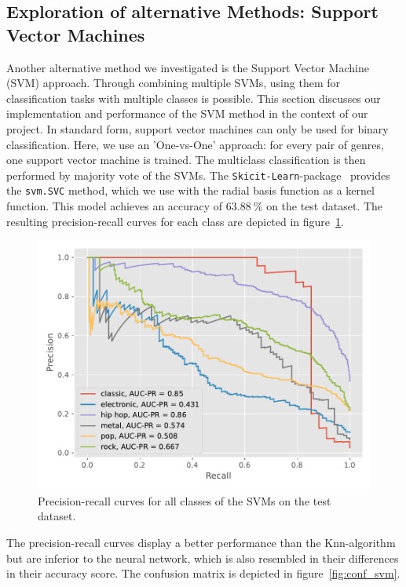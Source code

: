 \documentclass[
  12pt,
  bibliography=totoc,     %
  captions=tableheading,  %
  titlepage=firstiscover, %
]{scrartcl}
\begin{document}
\subsection{Exploration of alternative Methods: Support Vector Machines}
Another alternative method we investigated is the Support Vector Machine (SVM) approach. Through combining multiple SVMs, using them for classification tasks with multiple
classes is possible.
This section discusses our implementation and performance of the SVM method in the context of our project.
In standard form, support vector machines can only be used for binary classification. Here, we use an 'One-vs-One' approach: for every pair of genres, one support vector
machine is trained. The multiclass classification is then performed by majority vote of the SVMs. The \texttt{Skicit-Learn}-package~\cite{scikit-learn} provides the \texttt{svm.SVC} method,
which we use with the radial basis function as a kernel function. This model achieves an accuracy of $\SI{63.88}{\percent}$ on the test dataset. The resulting
precision-recall curves for each class are depicted in figure~\ref{fig:svm_pr}.
\begin{figure}[H]
  \centering
  \includegraphics[scale=0.7]{figures/svm/PR_SVM.pdf}
  \caption{Precision-recall curves for all classes of the SVMs on the test dataset.}
  \label{fig:svm_pr}
\end{figure}
\noindent
The precision-recall curves display a better performance than the Knn-algorithm but are inferior to the neural network, which is also resembled in their differences
in their accuracy score. The confusion matrix is depicted in figure~\ref{fig:conf_svm}.
\end{document}
